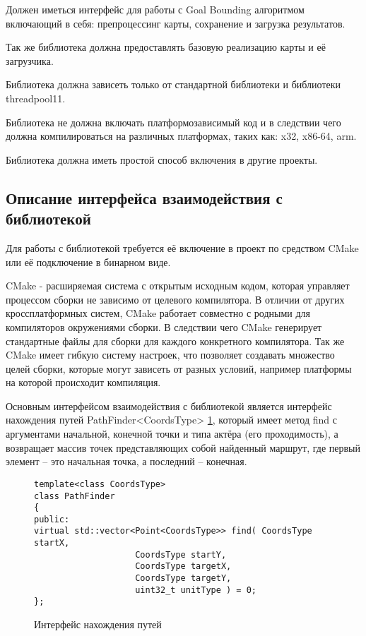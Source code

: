 Должен иметься интерфейс для работы с Goal Bounding алгоритмом включающий в себя: препроцессинг карты, сохранение и загрузка результатов.

Так же библиотека должна предоставлять базовую реализацию карты и её загрузчика.

Библиотека должна зависеть только от стандартной библиотеки и библиотеки threadpool11.

Библиотека не должна включать платформозависимый код и в следствии чего должна компилироваться на различных платформах, таких как: x32, x86-64, arm. 

Библиотека должна иметь простой способ включения в другие проекты.   

\subsection{Описание интерфейса взаимодействия с библиотекой}

Для работы с библиотекой требуется её включение в проект по средством CMake или её подключение в бинарном виде. 

CMake - расширяемая система с открытым исходным кодом, которая управляет процессом сборки не зависимо от целевого компилятора. В отличии от других кроссплатформных систем, CMake работает совместно с родными для компиляторов окружениями сборки. В следствии чего CMake генерирует стандартные файлы для сборки для каждого конкретного компилятора. Так же CMake имеет гибкую систему настроек, что позволяет создавать множество целей сборки, которые могут зависеть от разных условий, например платформы на которой происходит компиляция.

Основным интерфейсом взаимодействия с библиотекой является интерфейс нахождения путей PathFinder<CoordsType> \cref{fig:path_finding_interface}, который имеет метод find с аргументами начальной, конечной точки и типа актёра (его проходимость), а возвращает массив точек представляющих собой найденный маршрут, где первый элемент -- это начальная точка, а последний -- конечная.

\begin{figure}[!htb]
	\centering
	\captionsetup{justification=centering}
	\begin{lstlisting}
template<class CoordsType>
class PathFinder
{
public:
virtual std::vector<Point<CoordsType>> find( CoordsType startX, 
					CoordsType startY,
					CoordsType targetX,
					CoordsType targetY,
					uint32_t unitType ) = 0;
};
	\end{lstlisting}
	\caption{Интерфейс нахождения путей}
	\label{fig:path_finding_interface}
\end{figure}

